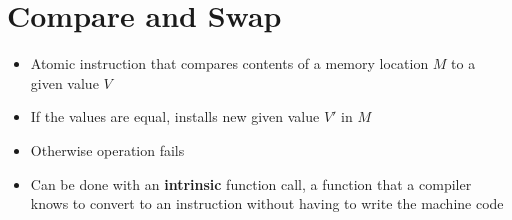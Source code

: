 \documentclass[11pt]{article}
\begin{document}
\maketitle
\thispagestyle{plain}

\section{Compare and Swap}
\begin{itemize}
    \item Atomic instruction that compares contents of a memory location $M$ to a given value $V$
    \item If the values are equal, installs new given value $V'$ in $M$
    \item Otherwise operation fails
    \item Can be done with an \textbf{intrinsic} function call, a function that a compiler knows to convert to an instruction without having to write the machine code
\end{itemize}
\end{document}
